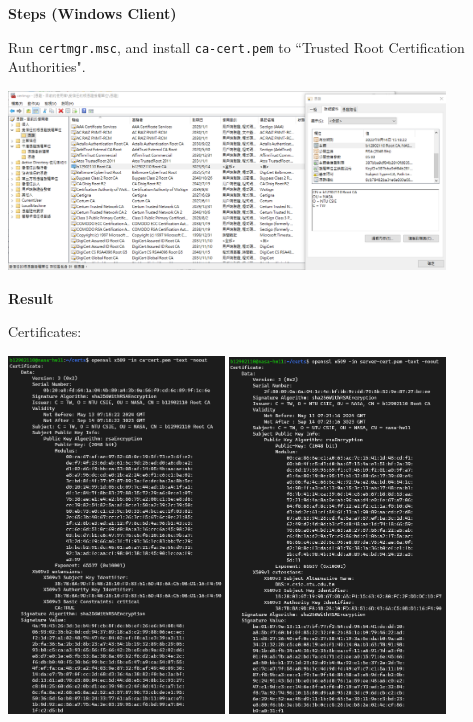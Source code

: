 \documentclass[12pt, a4paper]{article}
\begin{document}
\begin{enumerate}[resume]
\begin{enumerate}[resume]
      \pagebreak
      \textbf{Steps (Windows Client)}

      Run \verb|certmgr.msc|, and install \verb|ca-cert.pem| to
      ``Trusted Root Certification Authorities".

      \includegraphics[width=0.87\textwidth]{12-c_certmgr.png}

      \vspace{\baselineskip}
      \textbf{Result}

      Certificates:

      \includegraphics[width=0.43\textwidth]{12-c_ca-cert.png}
      \includegraphics[width=0.43\textwidth]{12-c_server-cert.png}


\end{enumerate}
\end{enumerate}
\end{document}
